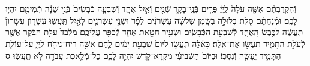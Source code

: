 \documentclass[twoside, openany, parskip=half, 11pt]{book}
\begin{document}
\begin{sometimes}
\begin{footnotesize}
\begin{multicols}{2}
\\
\\
וְֿהִקְרַבְתֶּ֨ם אִשֶּׁ֤ה עֹלָה֙ לַֽיְיָ֔ פָּרִ֧ים בְּֿנֵֽי־בָקָ֛ר שְֿׁנַ֖יִם וְֿאַ֣יִל אֶחָ֑ד וְֿשִׁבְעָ֤ה כְֿבָשִׂים֙ בְּֿנֵ֣י שָׁנָ֔ה תְּֿמִימִ֖ם יִהְי֥וּ לָכֶֽם׃ וּמִ֨נְחָתָ֔ם סֹ֖לֶת בְּֿלוּלָ֣ה בַשָּׁ֑מֶן שְֿׁלֹשָׁ֨ה עֶשְׂרֹנִ֜ים לַפָּ֗ר וּשְׁנֵ֧י עֶשְׂרֹנִ֛ים לָאַ֖יִל תַּֽעֲשֽׂוּ׃ עִשָּׂר֤וֹן עִשָּׂרוֹן֙ תַּֽעֲשֶׂ֔ה לַכֶּ֖בֶשׂ הָֽאֶחָ֑ד לְֿשִׁבְעַ֖ת הַכְּֿבָשִֽׂים׃ וּשְׂעִ֥יר חַטָּ֖את אֶחָ֑ד לְֿכַפֵּ֖ר עֲלֵיכֶֽם׃ מִלְּֿבַד֙ עֹלַ֣ת הַבֹּ֔קֶר אֲשֶׁ֖ר לְֿעֹלַ֣ת הַתָּמִ֑יד תַּֽעֲשׂ֖וּ אֶת־אֵֽלֶּה׃ כָּאֵ֜לֶּה תַּֽעֲשׂ֤וּ לַיּוֹם֙ שִׁבְעַ֣ת יָמִ֔ים לֶ֛חֶם אִשֵּׁ֥ה רֵֽיחַ־נִיחֹ֖חַ לַֽיְיָ֑ עַל־עוֹלַ֧ת הַתָּמִ֛יד יֵֽעָשֶׂ֖ה וְֿנִסְכּֽוֹ׃ וּבַיּוֹם֙ הַשְּֿׁבִיעִ֔י מִקְרָא־קֹ֖דֶשׁ יִהְיֶ֣ה לָכֶ֑ם כׇּל־מְֿלֶ֥אכֶת עֲבֹדָ֖ה לֹ֥א תַֽעֲשֽׂוּ׃ \textbf{ס}


\end{multicols}
\end{footnotesize}
\end{sometimes}
\end{document}
